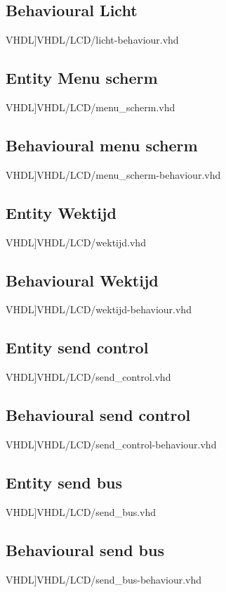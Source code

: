 \subsection{Behavioural Licht}
\scriptsize 
 VHDL]{VHDL/LCD/licht-behaviour.vhd}
\normalsize
\label{code:ent_menu_scherm}
\subsection{Entity Menu scherm}
\scriptsize 
 VHDL]{VHDL/LCD/menu_scherm.vhd}
\normalsize
\label{code:beh_menu_scherm}
\subsection{Behavioural menu scherm}
\scriptsize 
 VHDL]{VHDL/LCD/menu_scherm-behaviour.vhd}
\normalsize
\label{code:ent_wektijd}
\subsection{Entity Wektijd}
\scriptsize 
 VHDL]{VHDL/LCD/wektijd.vhd}
\normalsize
\label{code:beh_wektijd}
\subsection{Behavioural Wektijd}
\scriptsize 
 VHDL]{VHDL/LCD/wektijd-behaviour.vhd}
\normalsize
\label{code:ent_send_control}
\subsection{Entity send control}
\scriptsize 
 VHDL]{VHDL/LCD/send_control.vhd}
\normalsize
\label{code:beh_send_control}
\subsection{Behavioural send control}
\scriptsize 
 VHDL]{VHDL/LCD/send_control-behaviour.vhd}
\normalsize
\label{code:ent_send_bus}
\subsection{Entity send bus}
\scriptsize 
 VHDL]{VHDL/LCD/send_bus.vhd}
\normalsize
\label{code:beh_send_bus}
\subsection{Behavioural send bus}
\scriptsize 
 VHDL]{VHDL/LCD/send_bus-behaviour.vhd}
\normalsize
\label{code:ent_send_top}
